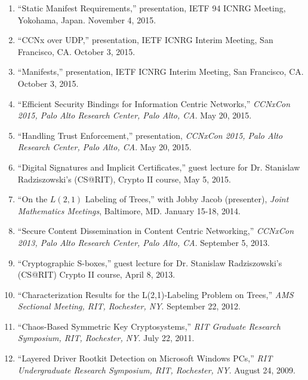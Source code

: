 \documentclass[10pt]{res} %
\begin{document}
\begin{resume}
\begin{enumerate}[T-1.]
\item ``Static Manifest Requirements,'' presentation, IETF 94 ICNRG Meeting, Yokohama, Japan. November 4, 2015.

\item ``CCNx over UDP,'' presentation, IETF ICNRG Interim Meeting, San Francisco, CA. October 3, 2015.

\item ``Manifests,'' presentation, IETF ICNRG Interim Meeting, San Francisco, CA. October 3, 2015.

\item ``Efficient Security Bindings for Information Centric Networks,'' \emph{CCNxCon 2015, Palo Alto Research Center, Palo Alto, CA}. May 20, 2015.

\item ``Handling Trust Enforcement,'' presentation, \emph{CCNxCon 2015, Palo Alto Research Center, Palo Alto, CA}. May 20, 2015.

\item ``Digital Signatures and Implicit Certificates,'' guest lecture for Dr. Stanislaw Radziszowski's (CS@RIT), Crypto II course, May 5, 2015.

\item ``On the $L(2,1)$ Labeling of Trees,'' with Jobby Jacob (presenter), \emph{Joint Mathematics Meetings}, Baltimore, MD. January 15-18, 2014.

\item ``Secure Content Dissemination in Content Centric Networking,'' \emph{CCNxCon 2013, Palo Alto Research Center, Palo Alto, CA}. September 5, 2013.

\item ``Cryptographic S-boxes,'' guest lecture for Dr. Stanislaw Radziszowski's (CS@RIT) Crypto II course, April 8, 2013.

\item ``Characterization Results for the L(2,1)-Labeling Problem on Trees,'' \emph{AMS Sectional Meeting, RIT, Rochester, NY}. September 22, 2012.

\item ``Chaos-Based Symmetric Key Cryptosystems,'' \emph{RIT Graduate Research Symposium, RIT, Rochester, NY}. July 22, 2011.

\item ``Layered Driver Rootkit Detection on Microsoft Windows PCs,'' \emph{RIT Undergraduate Research Symposium, RIT, Rochester, NY}. August 24, 2009.
\end{enumerate}
\vspace*{-16pt}


\end{resume}
\end{document}
